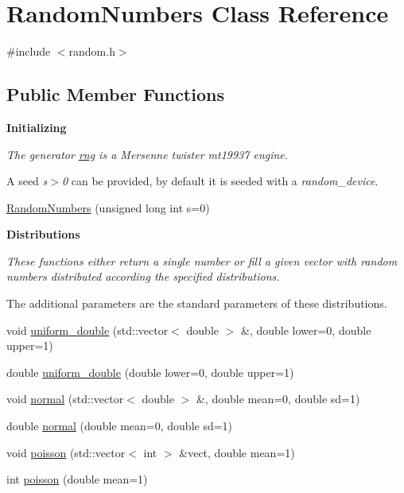 \hypertarget{classRandomNumbers}{}\section{Random\+Numbers Class Reference}
\label{classRandomNumbers}


{\ttfamily \#include $<$random.\+h$>$}

\subsection*{Public Member Functions}
\begin{Indent}\textbf{ Initializing}\par
{\em The generator \hyperlink{classRandomNumbers_a15ceee85d6d00de12ae76c90aaec2f14}{rng} is a Mersenne twister {\itshape mt19937} engine.

A seed {\itshape s$>$0} can be provided, by default it is seeded with a {\itshape random\+\_\+device}. }\begin{DoxyCompactItemize}
\item 
\hyperlink{classRandomNumbers_aeceac66b253ad00f58e7b2252f18f609}{Random\+Numbers} (unsigned long int s=0)
\end{DoxyCompactItemize}
\end{Indent}
\begin{Indent}\textbf{ Distributions}\par
{\em These functions either return a single number or fill a given vector with random numbers distributed according the specified distributions.

The additional parameters are the standard parameters of these distributions. }\begin{DoxyCompactItemize}
\item 
void \hyperlink{classRandomNumbers_ae226c129494f9055ac37ed1af943d010}{uniform\+\_\+double} (std\+::vector$<$ double $>$ \&, double lower=0, double upper=1)
\item 
double \hyperlink{classRandomNumbers_a1e66bf9926ad3916f3804dd20ea393f1}{uniform\+\_\+double} (double lower=0, double upper=1)
\item 
void \hyperlink{classRandomNumbers_a4ef5917200da65aa267735d389bdf995}{normal} (std\+::vector$<$ double $>$ \&, double mean=0, double sd=1)
\item 
double \hyperlink{classRandomNumbers_abbfcbae72e7dbd048567dd5b8e2ce9d2}{normal} (double mean=0, double sd=1)
\item 
void \hyperlink{classRandomNumbers_a1195251686ad00cd782c9a91a44d983b}{poisson} (std\+::vector$<$ int $>$ \&vect, double mean=1)
\item 
int \hyperlink{classRandomNumbers_ac5bd95dddabde62a74a0d871a66ce2f0}{poisson} (double mean=1)
\end{DoxyCompactItemize}
\end{Indent}
